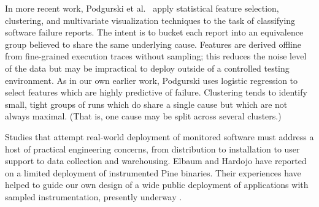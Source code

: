 \documentclass{sig-alternate}
\newcommand{\comment}[1]{}
\begin{document}
In more recent work, Podgurski et al.\ \cite{ICSE`03*465} apply
statistical feature selection, clustering, and multivariate
visualization techniques to the task of classifying software failure
reports.  The intent is to bucket each report into an equivalence
group believed to share the same underlying cause.  Features are
derived offline from fine-grained execution traces without sampling;
this reduces the noise level of the data but may be impractical to
deploy outside of a controlled testing environment.  As in our own
earlier work, Podgurski uses logistic regression to select features
which are highly predictive of failure.  \comment{Is it worth noting
  that we use different strategies for limiting the size of the set of
  selected features?  We use regularized logistic regression whereas
  Podgurski applies standard logistic regression to randomly selected
  subsets of the complete feature set and keeps the best-performing
  subset.}  Clustering tends to identify small, tight groups of runs
which do share a single cause but which are not always maximal.  (That
is, one cause may be split across several clusters.)

Studies that attempt real-world deployment of monitored software must
address a host of practical engineering concerns, from distribution to
installation to user support to data collection and warehousing.
Elbaum and Hardojo \cite{Elbaum:2003:DISATA} have reported on a
limited deployment of instrumented Pine binaries.  Their experiences
have helped to guide our own design of a wide public deployment of
applications with sampled instrumentation, presently underway
\cite{Liblit:2003:CBIP}.

\comment{More recent work of interest:

  \begin{itemize}
  \item S.\ Elbaum, S.\ Kanduri and A.\ Andrews, ``Anomalies as
    Precursors of Field Failures, International Symposium of Software
    Reliability Engineering'', IEEE, November 2003.

  \item S.\ Elbaum and M.\ Hardojo, ``An Empirical Study on Profiling
    Strategies for Released Software and Their Application to QA
    Activities'', Technical Report TR03-09-01, University of Nebraska
    - Lincoln, September 2003.
  \end{itemize}

  Cannot find either online, but have written to Elbaum asking him for
  copies.}
\end{document}
